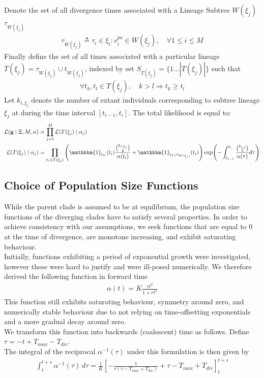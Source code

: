 \documentclass{report}
\theoremstyle{definition}
\begin{document}
Denote the set of all divergence times associated with a Lineage Subtree $W(\xi_j)$ $\tau_{W(\xi_j)}$
\begin{gather*}
\tau_{W(\xi_j)} \triangleq \tau_i \in \xi_i : v^{pa}_i \in W(\xi_j), \quad \forall 1\leq i\leq M
\end{gather*}
Finally define the set of all times associated with a particular lineage
$T(\xi_j) = \tau_{W(\xi_j)}\cup t_{W(\xi_j)}$, indexed by set $S_{T(\xi_j)}=\{1 ... |T(\xi_j)|\}$ such that
\begin{gather*}
\forall t_k, t_l \in T(\xi_j),\quad k>l \Rightarrow t_k \geq t_l
\end{gather*}
Let $k_{i,\xi_j}$ denote the number of extant individuals corresponding to subtree lineage $\xi_j$ at during the time interval $[t_{i-1}, t_i]$.
The total likelihood is equal to:
\begin{gather}
\begin{aligned}
\mathcal{L}(\mathbf{g}\mid \Xi, M, \mathbf{\alpha}) &= \prod_{j=1}^{M}\mathcal{L}(T(\xi_j) \mid \alpha_j) \\
\mathcal{L}(T(\xi_j) \mid \alpha_j) &= \prod_{t_i\in T(\xi_j)}\left(\mathbbm{1}_{t_Y}(t_i) \frac{\binom{k_{i,\xi_j}}{2}}{\alpha(t_i)}+\mathbbm{1}_{t_I\cup\tau_{W(\xi_j)}}(t_i)\right)
\exp(-\int_{t_{i-1}}^{t_i}\frac{\binom{k_{i,j}}{2}}{\alpha(\tau)}d\tau)
\end{aligned}
\end{gather}
\subsection{Choice of Population Size Functions} 
While the parent clade is assumed to be at equilibrium, the population size functions of the diverging clades have to satisfy several properties. 
In order to achieve consistency with our assumptions, we seek functions that are equal to $0$ at the time of divergence, are monotone increasing, and exhibit saturating behaviour. \\
Initially, functions exhibiting a period of exponential growth were investigated, however these were hard to justify and were ill-posed numerically.
We therefore derived the following function in forward time 
\begin{gather}
\alpha(t) = K\frac{rt^2}{1+rt^2}
\end{gather} 
This function still exhibits saturating behaviour, symmetry around zero, and numerically stable behaviour due to not relying on time-offsetting exponentials and a more gradual decay around zero.\\
We transform this function into backwards (coalescent) time as follows. 
Define $\tau = -t + T_{max} - T_{div}$.\\
The integral of the reciprocal $\alpha^{-1}(\tau)$ under this formulation is then given by 
\begin{gather}
\int_{t}^{t+s}\alpha^{-1}(\tau)\,d\tau = \frac{1}{K}\left[-\frac{1}{r(\tau-T_{max}+T_{div})}+\tau-T_{max}+T_{div}\right]_{t}^{t+s}
\end{gather}
\end{document}
